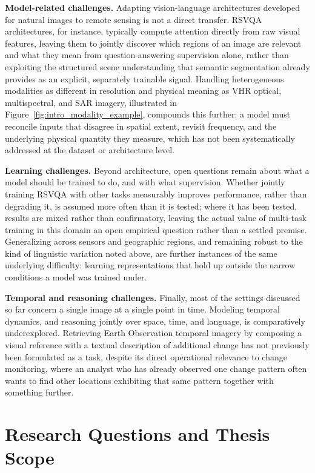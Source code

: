 \textbf{Model-related challenges.} Adapting vision-language architectures developed for natural images to remote sensing is not a direct transfer. RSVQA architectures, for instance, typically compute attention directly from raw visual features, leaving them to jointly discover which regions of an image are relevant and what they mean from question-answering supervision alone, rather than exploiting the structured scene understanding that semantic segmentation already provides as an explicit, separately trainable signal. Handling heterogeneous modalities as different in resolution and physical meaning as VHR optical, multispectral, and SAR imagery, illustrated in Figure~\ref{fig:intro_modality_example}, compounds this further: a model must reconcile inputs that disagree in spatial extent, revisit frequency, and the underlying physical quantity they measure, which has not been systematically addressed at the dataset or architecture level.
 
\textbf{Learning challenges.} Beyond architecture, open questions remain about what a model should be trained to do, and with what supervision. Whether jointly training RSVQA with other tasks measurably improves performance, rather than degrading it, is assumed more often than it is tested; where it has been tested, results are mixed rather than confirmatory, leaving the actual value of multi-task training in this domain an open empirical question rather than a settled premise. Generalizing across sensors and geographic regions, and remaining robust to the kind of linguistic variation noted above, are further instances of the same underlying difficulty: learning representations that hold up outside the narrow conditions a model was trained under.
 
\textbf{Temporal and reasoning challenges.} Finally, most of the settings discussed so far concern a single image at a single point in time. Modeling temporal dynamics, and reasoning jointly over space, time, and language, is comparatively underexplored. Retrieving Earth Observation temporal imagery by composing a visual reference with a textual description of additional change has not previously been formulated as a task, despite its direct operational relevance to change monitoring, where an analyst who has already observed one change pattern often wants to find other locations exhibiting that same pattern together with something further.
 
\section{Research Questions and Thesis Scope}
\label{sec:intro_rq_scope}
 
